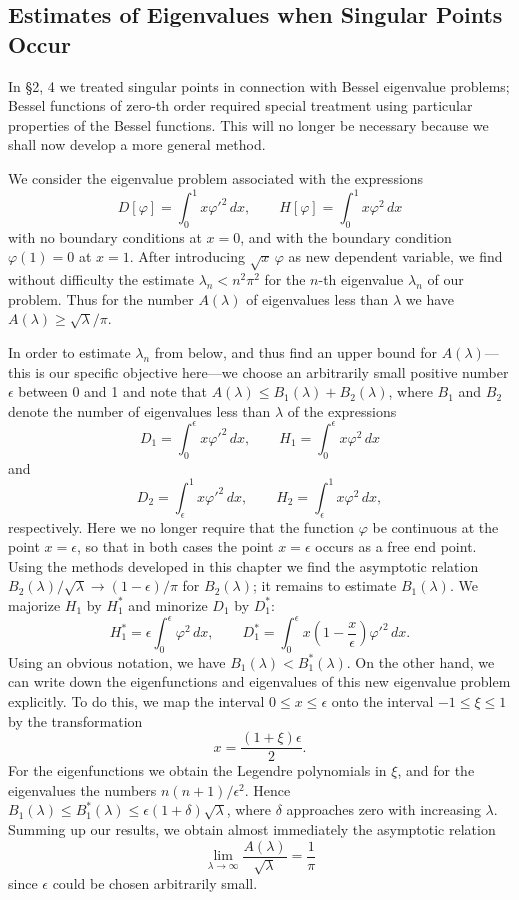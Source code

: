 \subsection{Estimates of Eigenvalues when Singular Points Occur}
In \S2, 4 we treated singular points in connection with Bessel eigenvalue problems; Bessel functions of zero-th order required special treatment using particular properties of the Bessel functions. This will no longer be necessary because we shall now develop a more general method.

We consider the eigenvalue problem associated with the expressions
\[
D[\varphi]=\int_0^1x\varphi'^2\,dx,
\qquad
H[\varphi]=\int_0^1x\varphi^2\,dx
\]
with no boundary conditions at $x=0$, and with the boundary condition $\varphi(1)=0$ at $x=1$. After introducing $\sqrt x\,\varphi$ as new dependent variable, we find without difficulty the estimate $\lambda_n<n^2\pi^2$ for the $n$-th eigenvalue $\lambda_n$ of our problem. Thus for the number $A(\lambda)$ of eigenvalues less than $\lambda$ we have $A(\lambda)\ge\sqrt\lambda/\pi$.

In order to estimate $\lambda_n$ from below, and thus find an upper bound for $A(\lambda)$---this is our specific objective here---we choose an arbitrarily small positive number $\epsilon$ between 0 and 1 and note that $A(\lambda)\le B_1(\lambda)+B_2(\lambda)$, where $B_1$ and $B_2$ denote the number of eigenvalues less than $\lambda$ of the expressions
\[
D_1=\int_0^\epsilon x\varphi'^2\,dx,
\qquad
H_1=\int_0^\epsilon x\varphi^2\,dx
\]
and
\[
D_2=\int_\epsilon^1 x\varphi'^2\,dx,
\qquad
H_2=\int_\epsilon^1 x\varphi^2\,dx,
\]
respectively. Here we no longer require that the function $\varphi$ be continuous at the point $x=\epsilon$, so that in both cases the point $x=\epsilon$ occurs as a free end point. Using the methods developed in this chapter we find the asymptotic relation $B_2(\lambda)/\sqrt\lambda\to(1-\epsilon)/\pi$ for $B_2(\lambda)$; it remains to estimate $B_1(\lambda)$. We majorize $H_1$ by $H_1^*$ and minorize $D_1$ by $D_1^*$:
\[
H_1^*=\epsilon\int_0^\epsilon\varphi^2\,dx,
\qquad
D_1^*=\int_0^\epsilon x\left(1-\frac{x}{\epsilon}\right)\varphi'^2\,dx.
\]
Using an obvious notation, we have $B_1(\lambda)<B_1^*(\lambda)$. On the other hand, we can write down the eigenfunctions and eigenvalues of this new eigenvalue problem explicitly. To do this, we map the interval $0\le x\le\epsilon$ onto the interval $-1\le\xi\le1$ by the transformation
\[
x=\frac{(1+\xi)\epsilon}{2}.
\]
For the eigenfunctions we obtain the Legendre polynomials in $\xi$, and for the eigenvalues the numbers $n(n+1)/\epsilon^2$. Hence $B_1(\lambda)\le B_1^*(\lambda)\le\epsilon(1+\delta)\sqrt\lambda$, where $\delta$ approaches zero with increasing $\lambda$. Summing up our results, we obtain almost immediately the asymptotic relation
\[
\lim_{\lambda\to\infty}\frac{A(\lambda)}{\sqrt\lambda}=\frac1\pi
\]
since $\epsilon$ could be chosen arbitrarily small.


